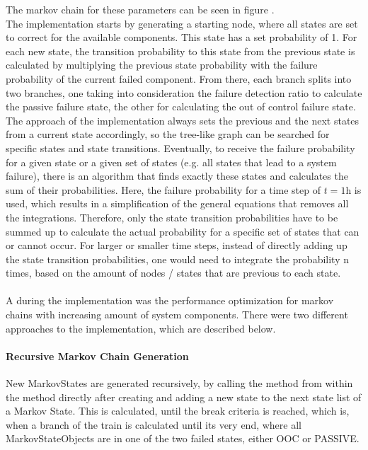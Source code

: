 The markov chain for these parameters can be seen in figure .
\\
The implementation starts by generating a starting node, where all states are set to correct for the available components.
This state has a set probability of 1.
For each new state, the transition probability to this state from the previous state is calculated by multiplying the previous state probability with the
failure probability of the current failed component.
From there, each branch splits into two branches, one taking into consideration the failure detection ratio to calculate the passive failure state, the other for calculating the
out of control failure state.
\\
The approach of the implementation always sets the previous and the next states from a current state accordingly, so the tree-like
graph can be searched for specific states and state transitions.
Eventually, to receive the failure probability for a given state or a given set of states (e.g. all states that lead to a system failure), there is an algorithm
that finds exactly these states and calculates the sum of their probabilities.
Here, the failure probability for a time step of $t = 1 \text{h}$ is used, which results in a simplification of the general equations that removes all the integrations.
Therefore, only the state transition probabilities have to be summed up to calculate the actual probability for a specific set of states that can or cannot occur.
For larger or smaller time steps, instead of directly adding up the state transition probabilities, one would need to integrate the probability n times, based on the amount of nodes
/ states that are previous to each state.
\\
\\
A during the implementation was the performance optimization for markov chains with increasing amount of system components.
There were two different approaches to the implementation, which are described below.
\paragraph{Recursive Markov Chain Generation}
New MarkovStates are generated recursively, by calling the method from within the method directly after creating and adding a new state to the next state list of a Markov State.
This is calculated, until the break criteria is reached, which is, when a branch of the train is calculated until its very end, where all MarkovStateObjects are in
one of the two failed states, either OOC or PASSIVE\@.
